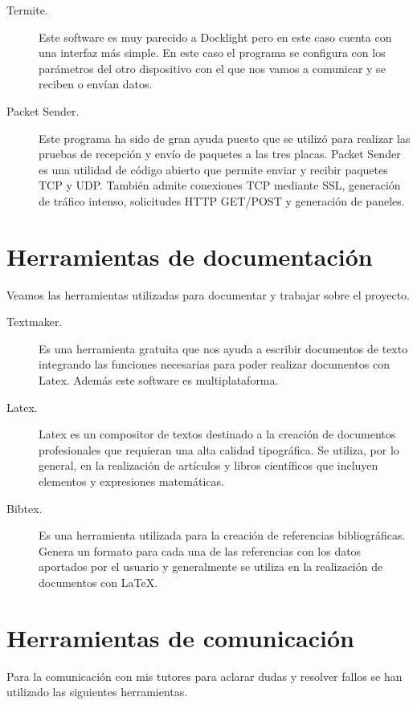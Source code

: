 \begin{description}
\item[Termite.]
Este software es muy parecido a Docklight pero en este caso cuenta con una interfaz más simple. En este caso el programa se configura con los parámetros del otro dispositivo con el que nos vamos a comunicar y se reciben o envían datos.

\item[Packet Sender.]
Este programa ha sido de gran ayuda puesto que se utilizó para realizar las pruebas de recepción y envío de paquetes a las tres placas. 
Packet Sender es una utilidad de código abierto que permite enviar y recibir paquetes TCP y UDP. También admite conexiones TCP mediante SSL, generación de tráfico intenso, solicitudes HTTP GET/POST y generación de paneles.
\end{description}


\section{Herramientas de documentación}\label{sec:HDocumentacion}
Veamos las herramientas utilizadas para documentar y trabajar sobre el proyecto.

\begin{description}
\item[Textmaker. \cite{wiki:TextMaker}]
Es una herramienta gratuita que nos ayuda a escribir documentos de texto integrando las funciones necesarias para poder realizar documentos con Latex. Además este software es multiplataforma.
\item[Latex. \cite{wiki:latex}]
Latex es un compositor de textos destinado a la creación de documentos profesionales que requieran una alta calidad tipográfica. Se utiliza, por lo general, en la realización de artículos y libros científicos que incluyen elementos y expresiones matemáticas.
\item[Bibtex. \cite{bibtex}]
Es una herramienta utilizada para la creación de referencias bibliográficas. Genera un formato para cada una de las referencias con los datos aportados por el usuario y generalmente se utiliza en la realización de documentos con LaTeX.
\end{description}

\section{Herramientas de comunicación}\label{sec:HComunicacion}
Para la comunicación con mis tutores para aclarar dudas y resolver fallos se han utilizado las siguientes herramientas.

